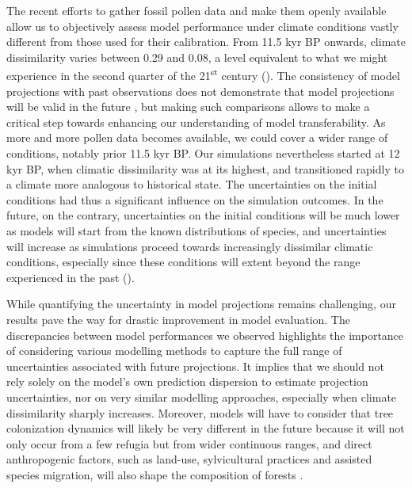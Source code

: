 The recent efforts to gather fossil pollen data and make them openly available \citep{Williams2018} allow us to objectively assess model performance under climate conditions vastly different from those used for their calibration. From 11.5 kyr BP onwards, climate dissimilarity varies between 0.29 and 0.08, a level equivalent to what we might experience in the second quarter of the 21\textsuperscript{st} century (). The  consistency of model projections with past observations does not demonstrate that model projections will be valid in the future \citep{Oreskes1994}, but making such comparisons allows to make a critical step towards enhancing our understanding of model transferability. As more and more pollen data becomes available, we could cover a wider range of conditions, notably prior 11.5 kyr BP. Our simulations nevertheless started at 12 kyr BP, when climatic dissimilarity was at its highest, and transitioned rapidly to a climate more analogous to historical state. The uncertainties on the initial conditions had thus a significant influence on the simulation outcomes. In the future, on the contrary, uncertainties on the initial conditions will be much lower as models will start from the known distributions of species, and uncertainties will increase as simulations proceed towards increasingly dissimilar climatic conditions, especially since these conditions  will extent beyond the range experienced in the past ().

While quantifying the uncertainty in model projections remains challenging, our results pave the way for drastic improvement in model evaluation. The discrepancies between model performances we observed highlights the importance of considering various modelling methods to capture the full range of uncertainties associated with future projections. It implies that we should not rely solely on the model's own prediction dispersion to estimate projection uncertainties, nor on very similar modelling approaches, especially when climate dissimilarity sharply increases. Moreover, models will have to consider that tree colonization dynamics will likely be very different in the future because it will not only occur from a few refugia but from wider continuous ranges, and direct anthropogenic factors, such as land-use, sylvicultural practices and assisted species migration, will also shape the composition of forests \citep{Aitken2016, Guo2018, Ivory2019}.

